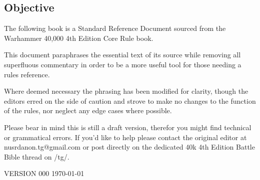 
\thispagestyle{titlingpage}

\begin{center}
\vspace*{1in}

\vspace*{0.25in}

\end{center}

\vspace*{0.75in}

\begin{center}
\begin{minipage}{0.75\textwidth}

\section*{Objective}

The following book is a Standard Reference Document sourced from the
Warhammer 40,000 4th Edition Core Rule book.

This document paraphrases the essential text of its source while removing all
superfluous commentary in order to be a more useful tool for those needing a
rules reference.

Where deemed necessary the phrasing has been modified for clarity, though the
editors erred on the side of caution and strove to make no changes to the
function of the rules, nor neglect any edge cases where possible.

Please bear in mind this is still a draft version, therefor you might find technical
or grammatical errors. If you'd like to help please contact the original editor at
nusrdanon.tg@gmail.com or post directly on the dedicated 40k 4th Edition
Battle Bible thread on /tg/.
\end{minipage}
\end{center}

\vfill

{\small\MakeUppercase{Version 000} \hfill \today}